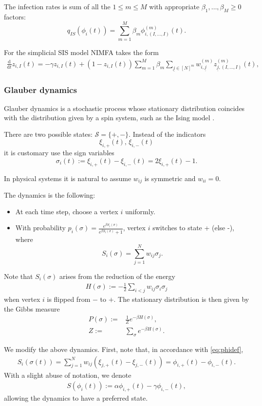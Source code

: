 \documentclass{article}
\renewcommand{\d}{\mathrm{d}}
\newcommand{\1}[1]{{\mathds{1}}_{\left\{#1\right\}}}
\renewcommand{\S}{\mathcal{S}}
\begin{document}
	The infection rates is sum of all the $1 \leq m \leq M$ with appropriate $\beta_1,\dots,\beta_M \geq 0$ factors:
	$$q_{IS}(\phi_i(t))=\sum_{m=1}^{M}\beta_m \phi_{i,(I,\dots,I)}^{(m)}(t). $$
	
	For the simplicial SIS model NIMFA takes the form
	\begin{align*}
		\frac{\d}{\d t} z_{i,I}(t)=-\gamma z_{i,I}(t)+\left(1-z_{i,I}(t) \right)\sum_{m=1}^{M}\beta_m \sum_{\underline{j} \in [N]^m}w_{i,\underline{j}}^{(m)}z_{\underline{j},(I,\dots,I)}^{(m)}(t),
	\end{align*}
	
	
	\subsubsection*{Glauber dynamics}
	
	Glauber dynamics is a stochastic process whose stationary distribution coincides with the distribution given by a spin system, such as the Ising model \cite{Glauber_original}.
	
	There are two possible states: $\S=\{+,-\}.$ Instead of the indicators 
	$$\xi_{i,+}(t),\, \xi_{i,-}(t)$$ 
	it is customary use the sign variables
	$$\sigma_i(t):=\xi_{i,+}(t)-\xi_{i,-}(t)=2 \xi_{i,+}(t)-1.$$ 
	
	In physical systems it is natural to assume $w_{ij}$ is symmetric and $w_{ii}=0$.
		
	The dynamics is the following:
	\begin{itemize}
		\item At each time step, choose a vertex $i$ uniformly.
		\item With probability $p_i(\sigma)=\frac{e^{\beta S_i(\sigma)}}{e^{\beta S_i(\sigma)}+1}$, vertex $i$ switches to state + (else -), where
		$$S_i(\sigma)=\sum_{j=1}^Nw_{ij}\sigma_j. $$
	\end{itemize}
	Note that $S_{i}(\sigma)$ arises from the reduction of the energy
	\begin{align*}
		H(\sigma):=-\frac{1}{2}\sum_{i<j}w_{ij}\sigma_{i}\sigma_{j}
	\end{align*}
	when vertex $i$ is flipped from $-$ to $+$.  The stationary distribution is then given by the Gibbs measure
	\begin{align*}
	P(\sigma):=& \frac{1}{Z}e^{-\beta H(\sigma)}, \\
	Z:=& \sum_{\sigma}e^{-\beta H(\sigma)}.
	\end{align*}

	We modify the above dynamics. First, note that, in accordance with \eqref{eq:phidef},
	\begin{align*}
	S_i(\sigma(t))=\sum_{j=1}^{N}w_{ij}\left(\xi_{j,+}(t)-\xi_{j,-}(t) \right)=\phi_{i,+}(t)-\phi_{i,-}(t).
	\end{align*}
	With a slight abuse of notation, we denote
	\begin{align*}
	S\left(\phi_i(t) \right):=\alpha \phi_{i,+}(t)-\gamma \phi_{i,-}(t),
	\end{align*}
	allowing the dynamics to have a preferred state.
	
\end{document}
